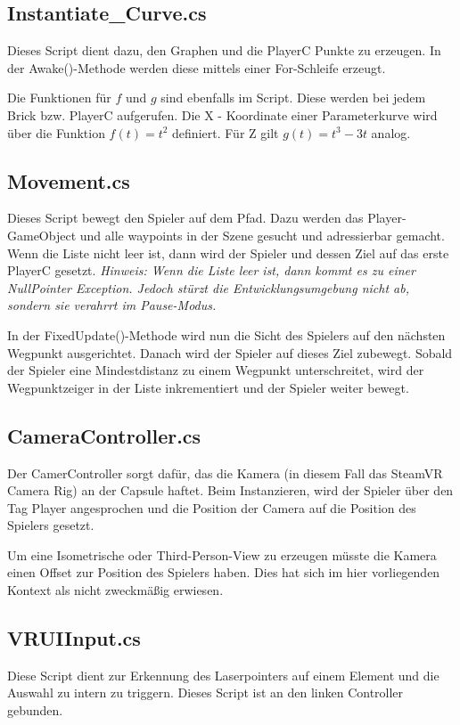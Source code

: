 \subsection{Instantiate\_Curve.cs}
\label{InstantiateCurve}
Dieses Script dient dazu, den Graphen und die PlayerC Punkte zu erzeugen. In der Awake()-Methode werden diese mittels einer For-Schleife erzeugt. 

Die Funktionen für $f$ und $g$ sind ebenfalls im Script. Diese werden bei jedem Brick bzw. PlayerC aufgerufen. Die X - Koordinate einer Parameterkurve wird über die Funktion $ f(t) = t^{2} $ definiert. Für Z gilt $g(t) = t^{3} - 3t$ analog. 


\subsection{Movement.cs}
\label{movement}
Dieses Script bewegt den Spieler auf dem Pfad. Dazu werden das Player-GameObject und alle waypoints in der Szene gesucht und adressierbar gemacht.
Wenn die Liste nicht leer ist, dann wird der Spieler und dessen Ziel auf das erste PlayerC gesetzt. 
\emph{Hinweis: Wenn die Liste leer ist, dann kommt es zu einer NullPointer Exception. Jedoch stürzt die Entwicklungsumgebung nicht ab, sondern sie verahrrt im Pause-Modus.}

In der FixedUpdate()-Methode wird nun die Sicht des Spielers auf den nächsten Wegpunkt ausgerichtet. Danach wird der Spieler auf dieses Ziel zubewegt. Sobald der Spieler eine Mindestdistanz zu einem Wegpunkt unterschreitet, wird der Wegpunktzeiger in der Liste inkrementiert und der Spieler weiter bewegt.

\subsection{CameraController.cs}
\label{cameraController}
Der CamerController sorgt dafür, das die Kamera (in diesem Fall das SteamVR Camera Rig) an der Capsule haftet. Beim Instanzieren, wird der Spieler über den Tag \glqq Player\grqq{} angesprochen und die Position der Camera auf die Position des Spielers gesetzt. 

Um eine Isometrische oder Third-Person-View zu erzeugen müsste die Kamera einen Offset zur Position des Spielers haben. Dies hat sich im hier vorliegenden Kontext als nicht zweckmäßig erwiesen. 

\subsection{VRUIInput.cs}
\label{VRUIInput}
Diese Script dient zur Erkennung des Laserpointers auf einem Element und die Auswahl zu intern zu triggern. Dieses Script ist an den linken Controller gebunden. 

